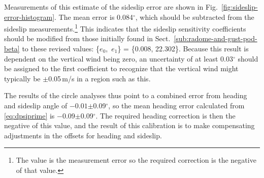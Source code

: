 \documentclass[12pt,twoside,english]{article}\usepackage[]{graphicx}\usepackage[]{color}
\let\OrgIndex\index
\renewcommand*{\index}[1]{\OrgIndex{#1}}
\begin{document}
Measurements of this estimate of the sideslip error are shown in Fig.~\ref{fig:sideslip-error-histogram}. The mean error is 0.084$^{\circ}$, which  should be subtracted from the sideslip measurements.\footnote{The value is the measurement error so the required correction is the negative of that value.} 
This indicates that the sideslip sensitivity coefficients should be modified from those initially found in Sect.~\ref{sub:radome-and-gust-pod-beta} to these revised values:\label{page:SSoffset} \{$e_{0}$,\, $e_{1}$\} = \{0.008, 22.302\}. Because this result is dependent on the vertical wind being zero, an uncertainty of at least 0.03$^{\circ}$ should be assigned to the first coefficient to recognize that the vertical wind might typically be $\pm$0.05\,m/s in a region such as this.%

The results of the circle analyses thus point to a combined error from heading and sideslip angle of %
\ensuremath{-0.01}$\pm$0.09$^{\circ}$, so the mean heading error  calculated from \eqref{eq:dpsiprime} is 
\ensuremath{-0.09}$\pm$0.09$^{\circ}$. 
The required heading correction is then the negative of this value, and the result of this calibration is to make compensating adjustments in the offsets for heading and sideslip. 

% 
\end{document}
